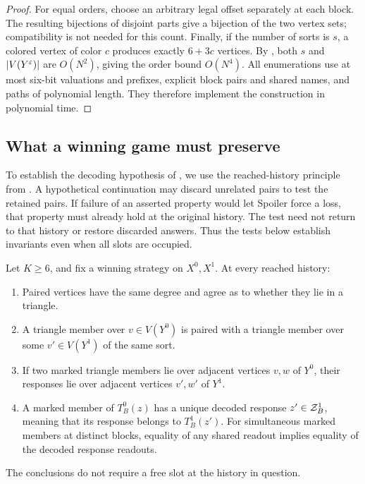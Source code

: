 \begin{proof}
For equal orders, choose an arbitrary legal offset separately at each
block.  The resulting bijections of disjoint parts give a bijection
of the two vertex sets; compatibility is not needed for this count.
Finally, if the number of sorts is \(s\), a colored vertex of color
\(c\) produces exactly \(6+3c\) vertices.
By , both \(s\) and \(\lvert V(Y^\varepsilon)\rvert\)
are \(O(N^2)\), giving the order bound \(O(N^4)\).
All enumerations use at most six-bit valuations and prefixes, explicit
block pairs and shared names, and paths of polynomial length.
They therefore implement the construction in polynomial time.
\end{proof}

\subsection{What a winning game must preserve}

To establish the decoding hypothesis of ,
we use the reached-history principle from .
A hypothetical continuation may discard unrelated pairs to test the
retained pairs. If failure of an asserted property would let Spoiler
force a loss, that property must already hold at the original history.
The test need not return to that history or restore discarded answers.
Thus the tests below establish invariants even when all slots are occupied.

\begin{lemma}
\label{lem:graph-recognition}
Let \(K\ge6\), and fix a winning strategy on \(X^0,X^1\).
At every reached history:
\begin{enumerate}
\item
Paired vertices have the same degree and agree as to whether they lie
in a triangle.
\item
A triangle member over \(v\in V(Y^0)\) is paired with a triangle
member over some \(v'\in V(Y^1)\) of the same sort.
\item
If two marked triangle members lie over adjacent vertices \(v,w\)
of \(Y^0\), their responses lie over adjacent vertices \(v',w'\)
of \(Y^1\).
\item
A marked member of \(T_B^0(z)\) has a unique decoded response
\(z'\in\mathcal Z_B^1\), meaning that its response belongs to \(T_B^1(z')\).
For simultaneous marked members at distinct blocks, equality of any
shared readout implies equality of the decoded response readouts.
\end{enumerate}
The conclusions do not require a free slot at the history in question.
\end{lemma}

